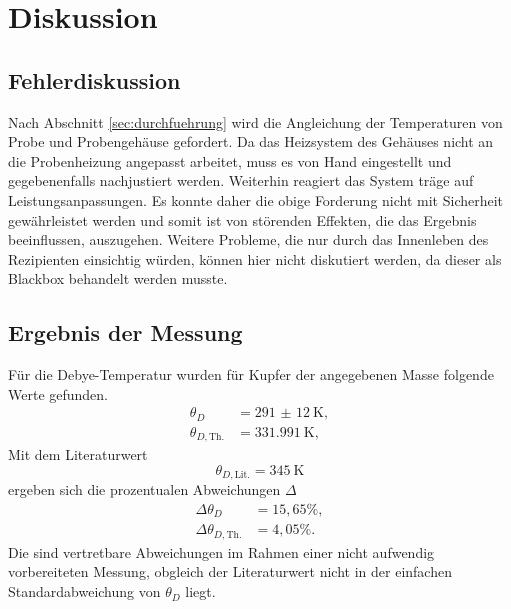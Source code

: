 \section{Diskussion}
\label{sec:Diskussion}

\subsection{Fehlerdiskussion}
Nach Abschnitt \ref{sec:durchfuehrung} wird die Angleichung der Temperaturen von Probe und Probengehäuse gefordert.
Da das Heizsystem des Gehäuses nicht an die Probenheizung angepasst arbeitet, 
muss es von Hand eingestellt und gegebenenfalls nachjustiert werden.
Weiterhin reagiert das System träge auf Leistungsanpassungen. 
Es konnte daher die obige Forderung nicht mit Sicherheit gewährleistet werden und 
somit ist von störenden Effekten, die das Ergebnis beeinflussen, auszugehen.
Weitere Probleme, 
die nur durch das Innenleben des Rezipienten einsichtig würden, können hier nicht diskutiert werden, 
da dieser als Blackbox behandelt werden musste.

\subsection{Ergebnis der Messung}
Für die Debye-Temperatur wurden für Kupfer der angegebenen Masse folgende Werte gefunden. 
\begin{align}
	\theta_D &= \SI{291(12)}{\kelvin},\\
	\theta_{D, \text{Th.}} &= \SI{331.991}{\kelvin},
\end{align}
Mit dem Literaturwert \cite{debye-kupfer}
\begin{equation}
	\theta_{D, \text{Lit.}} = \SI{345}{\kelvin}
\end{equation}
ergeben sich die prozentualen Abweichungen $\Delta$
\begin{align}
	\Delta\theta_D &= 15{,}65 \%,\\
	\Delta\theta_{D, \text{Th.}} &= 4{,}05 \%.
\end{align}
Die sind vertretbare Abweichungen im Rahmen einer nicht aufwendig vorbereiteten Messung, 
obgleich der Literaturwert nicht in der einfachen Standardabweichung von $\theta_D$ liegt.

